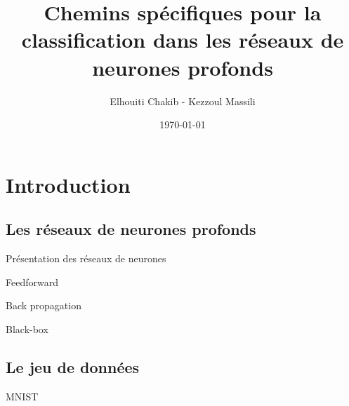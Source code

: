 \documentclass[10pt,handout]{beamer}
\title[Chemins spécifiques]{Chemins spécifiques pour la classification dans les réseaux de neurones profonds}
\author[Elhouiti, Kezzoul]{ Elhouiti Chakib - Kezzoul Massili \\}
\institute[]{Université de Montpellier}
\date{\today}
\newif\ifplacelogo %
\begin{document}
\placelogofalse
\begin{frame}
	\titlepage
\end{frame}

\placelogotrue

\section{Introduction}
\subsection{Les réseaux de neurones profonds}
\begin{frame}{Présentation des réseaux de neurones}
    
\end{frame}

\begin{frame}{Feedforward}
    
\end{frame}

\begin{frame}{Back propagation}
    
\end{frame}

\begin{frame}{Black-box}
    
\end{frame}

\placelogofalse 
\subsection{Le jeu de données}
\begin{frame}{MNIST}
\end{frame}
\placelogotrue
\end{document}
